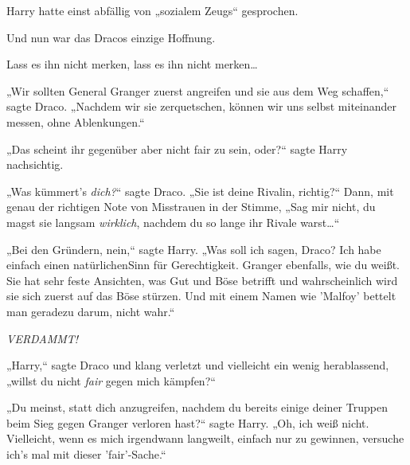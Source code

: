 Harry hatte einst abfällig von „sozialem Zeugs“ gesprochen.

Und nun war das Dracos einzige Hoffnung.

Lass es ihn nicht merken, lass es ihn nicht merken…

„Wir sollten General Granger zuerst angreifen und sie aus dem Weg schaffen,“ sagte Draco. „Nachdem wir sie zerquetschen, können wir uns selbst miteinander messen, ohne Ablenkungen.“

„Das scheint ihr gegenüber aber nicht fair zu sein, oder?“ sagte Harry nachsichtig.

„Was kümmert's \emph{dich?}“ sagte Draco. „Sie ist deine Rivalin, richtig?“ Dann, mit genau der richtigen Note von Misstrauen in der Stimme, „Sag mir nicht, du magst sie langsam \emph{wirklich}, nachdem du so lange ihr Rivale warst…“

„Bei den Gründern, nein,“ sagte Harry. „Was soll ich sagen, Draco? Ich habe einfach einen natürlichenSinn für Gerechtigkeit. Granger ebenfalls, wie du weißt. Sie hat sehr feste Ansichten, was Gut und Böse betrifft und wahrscheinlich wird sie sich zuerst auf das Böse stürzen. Und mit einem Namen wie 'Malfoy' bettelt man geradezu darum, nicht wahr.“

\emph{VERDAMMT!}

„Harry,“ sagte Draco und klang verletzt und vielleicht ein wenig herablassend, „willst du nicht \emph{fair} gegen mich kämpfen?“

„Du meinst, statt dich anzugreifen, nachdem du bereits einige deiner Truppen beim Sieg gegen Granger verloren hast?“ sagte Harry. „Oh, ich weiß nicht. Vielleicht, wenn es mich irgendwann langweilt, einfach nur zu gewinnen, versuche ich's mal mit dieser 'fair'-Sache.“

